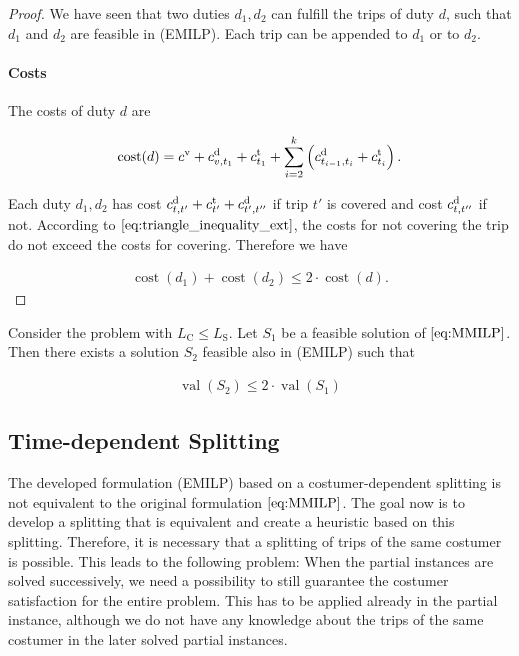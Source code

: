 \begin{proof}
We have seen that two duties $d_1,d_2$ can fulfill the trips of duty $d$, such that $d_1$ and $d_2$ are feasible in (EMILP). Each trip can be appended to $d_1$ or to $d_2$.

\paragraph{Costs}

The costs of duty $d$ are

\begin{align*}
	\operatorname{cost}(d)=c^{\operatorname{v}}+c^{\operatorname{d}}_{v,t_1}+c^{\operatorname{t}}_{t_1}+\sum_{i=2}^k \left(c^{\operatorname{d}}_{t_{i-1},t_i}+c^{\operatorname{t}}_{t_i}\right).
\end{align*}

Each duty $d_1,d_2$ has cost $c^{\operatorname{d}}_{t,t'}+c^{\operatorname{t}}_{t'}+c^{\operatorname{d}}_{t',t''}$ if trip $t'$ is covered and cost $c^{\operatorname{d}}_{t,t''}$ if not. According to $\eqref{eq:triangle_inequality_ext}$, the costs for not covering the trip do not exceed the costs for covering. Therefore we have

\begin{align*}
	\operatorname{cost}\left(d_1\right)+\operatorname{cost}\left(d_2\right)\leq 2\cdot\operatorname{cost}\left(d\right).
\end{align*}

\end{proof}

\begin{corollary}

Consider the problem with $L_{\operatorname{C}}\leq L_{\operatorname{S}}$. Let $S_1$ be a feasible solution of $\eqref{eq:MMILP}$. Then there exists a solution $S_2$ feasible also in (EMILP) such that

\begin{align*}
	\operatorname{val}\left(S_2\right)\leq 2\cdot\operatorname{val}\left(S_1\right)
\end{align*}

\end{corollary}


\subsection{Time-dependent Splitting}

The developed formulation (EMILP) based on a costumer-dependent splitting is not equivalent to the original formulation $\eqref{eq:MMILP}$. The goal now is to develop a splitting that is equivalent and create a heuristic based on this splitting. Therefore, it is necessary that a splitting of trips of the same costumer is possible. This leads to the following problem: When the partial instances are solved successively, we need a possibility to still guarantee the costumer satisfaction for the entire problem. This has to be applied already in the partial instance, although we do not have any knowledge about the trips of the same costumer in the later solved partial instances.


